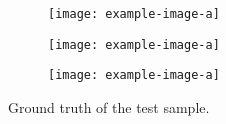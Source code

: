 \begin{figure}[H]
\begin{center}
    \begin{subfigure}[t]{.3\linewidth}
    \centering\texttt{[image: example-image-a]}
	\caption{}
  \end{subfigure}
  \begin{subfigure}[t]{.3\linewidth}
    \centering\texttt{[image: example-image-a]}
	\caption{}
  \end{subfigure}
  \begin{subfigure}[t]{.3\linewidth}
    \centering\texttt{[image: example-image-a]}
	\caption{}
  \end{subfigure}
    \caption{Ground truth of the test sample.}
    \label{fig:gt}
 \end{center}
\end{figure}




